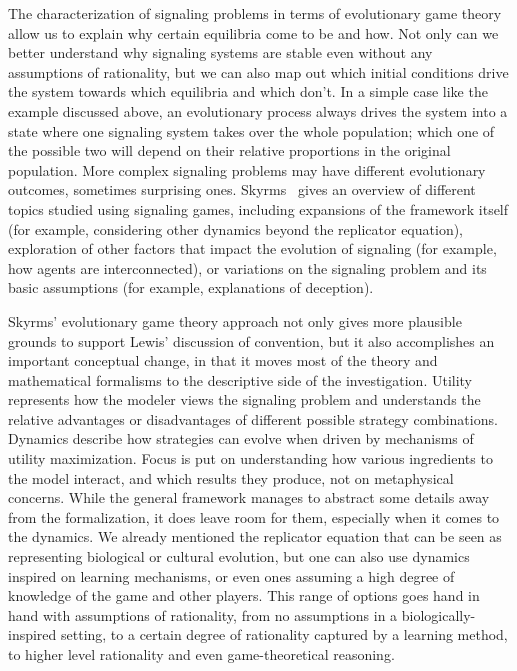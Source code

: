 \documentclass[a4paper]{article}
\begin{document}
The characterization of signaling problems in terms of evolutionary game theory allow us to explain why certain equilibria come to be and how.
Not only can we better understand why signaling systems are stable even without any assumptions of rationality, but we can also map out which initial conditions drive the system towards which equilibria and which don't.
In a simple case like the example discussed above, an evolutionary process always drives the system into a state where one signaling system takes over the whole population; which one of the possible two will depend on their relative proportions in the original population.
More complex signaling problems may have different evolutionary outcomes, sometimes surprising ones.
Skyrms~\parencite*{skyrms_signals_2010} gives an overview of different topics studied using signaling games, including expansions of the framework itself (for example, considering other dynamics beyond the replicator equation), exploration of other factors that impact the evolution of signaling (for example, how agents are interconnected), or variations on the signaling problem and its basic assumptions (for example, explanations of deception).

Skyrms' evolutionary game theory approach not only gives more plausible grounds to support Lewis' discussion of convention, but it also accomplishes an important conceptual change, in that it moves most of the theory and mathematical formalisms to the descriptive side of the investigation.
Utility represents how the modeler views the signaling problem and understands the relative advantages or disadvantages of different possible strategy combinations.
Dynamics describe how strategies can evolve when driven by mechanisms of utility maximization.
Focus is put on understanding how various ingredients to the model interact, and which results they produce, not on metaphysical concerns.
While the general framework manages to abstract some details away from the formalization, it does leave room for them, especially when it comes to the dynamics.
We already mentioned the replicator equation that can be seen as representing biological or cultural evolution, but one can also use dynamics inspired on learning mechanisms, or even ones assuming a high degree of knowledge of the game and other players.
This range of options goes hand in hand with assumptions of rationality, from no assumptions in a biologically-inspired setting, to a certain degree of rationality captured by a learning method, to higher level rationality and even game-theoretical reasoning.
\end{document}
